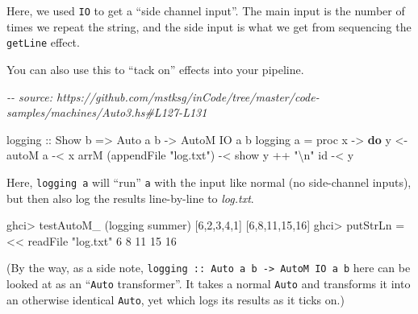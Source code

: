 \documentclass[]{article}
\newenvironment{Shaded}{}{}
\newcommand{\CommentTok}[1]{\textcolor[rgb]{0.38,0.63,0.69}{\textit{#1}}}
\newcommand{\DataTypeTok}[1]{\textcolor[rgb]{0.56,0.13,0.00}{#1}}
\newcommand{\DecValTok}[1]{\textcolor[rgb]{0.25,0.63,0.44}{#1}}
\newcommand{\FunctionTok}[1]{\textcolor[rgb]{0.02,0.16,0.49}{#1}}
\newcommand{\KeywordTok}[1]{\textcolor[rgb]{0.00,0.44,0.13}{\textbf{#1}}}
\newcommand{\NormalTok}[1]{#1}
\newcommand{\OperatorTok}[1]{\textcolor[rgb]{0.40,0.40,0.40}{#1}}
\newcommand{\OtherTok}[1]{\textcolor[rgb]{0.00,0.44,0.13}{#1}}
\newcommand{\StringTok}[1]{\textcolor[rgb]{0.25,0.44,0.63}{#1}}
\begin{document}
Here, we used \texttt{IO} to get a ``side channel input''. The main input is the
number of times we repeat the string, and the side input is what we get from
sequencing the \texttt{getLine} effect.

You can also use this to ``tack on'' effects into your pipeline.

\begin{Shaded}
\begin{Highlighting}[]
\CommentTok{{-}{-} source: https://github.com/mstksg/inCode/tree/master/code{-}samples/machines/Auto3.hs\#L127{-}L131}

\OtherTok{logging ::} \DataTypeTok{Show}\NormalTok{ b }\OtherTok{=\textgreater{}} \DataTypeTok{Auto}\NormalTok{ a b }\OtherTok{{-}\textgreater{}} \DataTypeTok{AutoM} \DataTypeTok{IO}\NormalTok{ a b}
\NormalTok{logging a }\OtherTok{=}\NormalTok{ proc x }\OtherTok{{-}\textgreater{}} \KeywordTok{do}
\NormalTok{    y }\OtherTok{\textless{}{-}}\NormalTok{ autoM a }\OperatorTok{{-}\textless{}}\NormalTok{ x}
\NormalTok{    arrM (}\FunctionTok{appendFile} \StringTok{"log.txt"}\NormalTok{) }\OperatorTok{{-}\textless{}} \FunctionTok{show}\NormalTok{ y }\OperatorTok{++} \StringTok{"\textbackslash{}n"}
    \FunctionTok{id} \OperatorTok{{-}\textless{}}\NormalTok{ y}
\end{Highlighting}
\end{Shaded}

Here, \texttt{logging\ a} will ``run'' \texttt{a} with the input like normal (no
side-channel inputs), but then also log the results line-by-line to
\emph{log.txt}.

\begin{Shaded}
\begin{Highlighting}[]
\NormalTok{ghci}\OperatorTok{\textgreater{}}\NormalTok{ testAutoM\_ (logging summer) [}\DecValTok{6}\NormalTok{,}\DecValTok{2}\NormalTok{,}\DecValTok{3}\NormalTok{,}\DecValTok{4}\NormalTok{,}\DecValTok{1}\NormalTok{]}
\NormalTok{[}\DecValTok{6}\NormalTok{,}\DecValTok{8}\NormalTok{,}\DecValTok{11}\NormalTok{,}\DecValTok{15}\NormalTok{,}\DecValTok{16}\NormalTok{]}
\NormalTok{ghci}\OperatorTok{\textgreater{}} \FunctionTok{putStrLn} \OperatorTok{=\textless{}\textless{}} \FunctionTok{readFile} \StringTok{"log.txt"}
\DecValTok{6}
\DecValTok{8}
\DecValTok{11}
\DecValTok{15}
\DecValTok{16}
\end{Highlighting}
\end{Shaded}

(By the way, as a side note,
\texttt{logging\ ::\ Auto\ a\ b\ -\textgreater{}\ AutoM\ IO\ a\ b} here can be
looked at as an ``\texttt{Auto} transformer''. It takes a normal \texttt{Auto}
and transforms it into an otherwise identical \texttt{Auto}, yet which logs its
results as it ticks on.)
\end{document}
